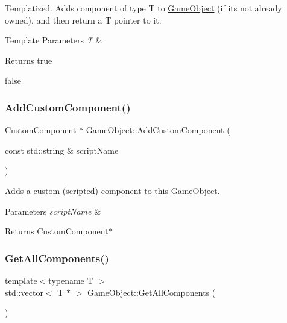 Templatized. Adds component of type T to \hyperlink{classGameObject}{Game\+Object} (if its not already owned), and then return a T pointer to it. 


\begin{DoxyTemplParams}{Template Parameters}
{\em T} & \\
\hline
\end{DoxyTemplParams}
\begin{DoxyReturn}{Returns}
true 

false 
\end{DoxyReturn}
\mbox{\label{classGameObject_ad388a379be13bf21977558f1e00906c3}} 
\subsubsection{\texorpdfstring{Add\+Custom\+Component()}{AddCustomComponent()}}
{\footnotesize\ttfamily \hyperlink{classCustomComponent}{Custom\+Component} $\ast$ Game\+Object\+::\+Add\+Custom\+Component (\begin{DoxyParamCaption}\item[{const std\+::string \&}]{script\+Name }\end{DoxyParamCaption})}



Adds a custom (scripted) component to this \hyperlink{classGameObject}{Game\+Object}. 


\begin{DoxyParams}{Parameters}
{\em script\+Name} & \\
\hline
\end{DoxyParams}
\begin{DoxyReturn}{Returns}
Custom\+Component$\ast$ 
\end{DoxyReturn}
\mbox{\label{classGameObject_a0962252e1ed643ec1fde58da7dec4c2c}} 
\subsubsection{\texorpdfstring{Get\+All\+Components()}{GetAllComponents()}}
{\footnotesize\ttfamily template$<$typename T $>$ \\
std\+::vector$<$ T $\ast$ $>$ Game\+Object\+::\+Get\+All\+Components (\begin{DoxyParamCaption}{ }\end{DoxyParamCaption})}



